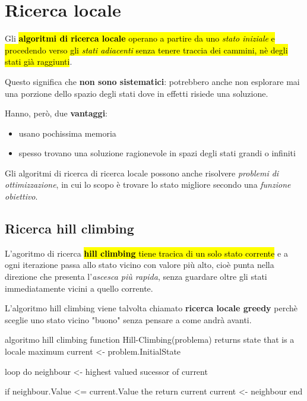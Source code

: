\documentclass[12pt, a4paper, oneside]{book}
\begin{document}
    \section{Ricerca locale}
    Gli \hl{\textbf{algoritmi di ricerca locale} operano a partire da uno \textit{stato iniziale} e procedendo verso gli \textit{stati adiacenti} senza tenere traccia dei cammini, nè degli stati già raggiunti}.

    Questo significa che \textbf{non sono sistematici}: potrebbero anche non esplorare mai una porzione dello spazio degli stati dove in effetti risiede una soluzione.

    Hanno, però, due \textbf{vantaggi}:
    \begin{itemize}
      \item usano pochissima memoria
      \item spesso trovano una soluzione ragionevole in spazi degli stati grandi o infiniti
    \end{itemize}

    Gli algoritmi di ricerca di ricerca locale possono anche risolvere \textit{problemi di ottimizzazione}, in cui lo scopo è trovare lo stato migliore secondo una \textit{funzione obiettivo}.

    \subsection{Ricerca hill climbing}
    L'agoritmo di ricerca \hl{\textbf{hill climbing} tiene tracica di un solo stato corrente} e a ogni iterazione passa allo stato vicino con valore più alto, cioè punta nella direzione che presenta l'\textit{ascesca più rapida}, senza guardare oltre gli stati immediatamente vicini a quello corrente.

    L'algoritmo hill climbing viene talvolta chiamato \textbf{ricerca locale greedy} perchè sceglie uno stato vicino "buono" senza pensare a come andrà avanti.

    \begin{codice}[python]{algoritmo hill climbing}
    function Hill-Climbing(problema) returns state that is a locale maximum 
      current <- problem.InitialState

      loop do
        neighbour <- highest valued sucessor of current
        
        if neighbour.Value <= current.Value the return current
        current <- neighbour
      end
    \end{codice}
\end{document}
